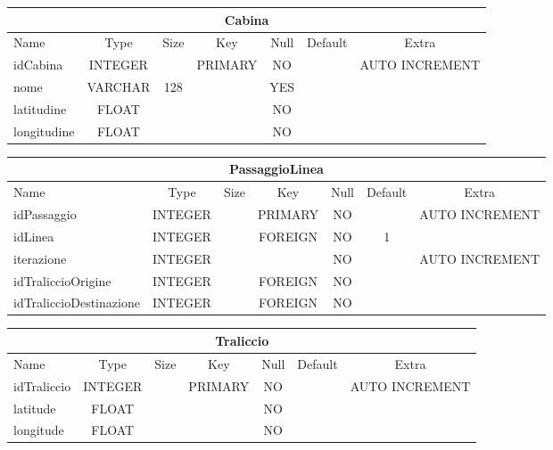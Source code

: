 \begin{center}
    \begin{tabular}{ |l|c|c|c|c|c|c| } 
        \hline
        \multicolumn{7}{|c|}{Cabina} \\
        \hline
            Name             & Type     & Size  & Key       & Null  & Default   & Extra \\
        \hline
            idCabina         & INTEGER  &       & PRIMARY   & NO    &           & AUTO INCREMENT \\
            nome             & VARCHAR  & 128   &           & YES   &           & \\
            latitudine       & FLOAT    &       &           & NO    &           & \\
            longitudine      & FLOAT    &       &           & NO    &           & \\
        \hline
    \end{tabular}
\end{center}

\begin{center}
    \begin{tabular}{ |l|c|c|c|c|c|c| } 
        \hline
        \multicolumn{7}{|c|}{PassaggioLinea} \\
        \hline
            Name                    & Type     & Size   & Key       & Null  & Default   & Extra \\
        \hline
            idPassaggio             & INTEGER  &        & PRIMARY   & NO    &           & AUTO INCREMENT \\
            idLinea                 & INTEGER  &        & FOREIGN   & NO    & 1         & \\
            iterazione              & INTEGER  &        &           & NO    &           & AUTO INCREMENT \\
            idTraliccioOrigine      & INTEGER  &        & FOREIGN   & NO    &           & \\
            idTraliccioDestinazione & INTEGER  &        & FOREIGN   & NO    &           & \\
        \hline
    \end{tabular}
\end{center}

\begin{center}
    \begin{tabular}{ |l|c|c|c|c|c|c| } 
        \hline
        \multicolumn{7}{|c|}{Traliccio} \\
        \hline
            Name             & Type     & Size  & Key       & Null  & Default   & Extra \\
        \hline
            idTraliccio      & INTEGER  &       & PRIMARY   & NO    &           & AUTO INCREMENT \\
            latitude         & FLOAT    &       &           & NO    &           & \\
            longitude        & FLOAT    &       &           & NO    &           & \\
        \hline
    \end{tabular}
\end{center}

